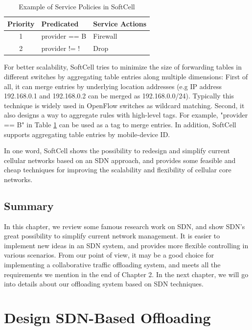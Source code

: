 \documentclass[english]{tktltiki}
\begin{document}
\begin{table}
  \centering
  \begin{tabular}{|c|l|l|}
    \hline
    Priority & Predicated & Service Actions \\
    \hline
    1 & provider == B & Firewall \\
    \hline
    2 & provider != ! & Drop \\
    \hline
  \end{tabular}
  \caption{Example of Service Policies in SoftCell}  
  \label{tab:softcell}
\end{table}

For better scalability, SoftCell tries to minimize the size of forwarding tables in different switches by aggregating table entries along multiple dimensions: First of all, it can merge entries by underlying location addresses (e.g IP address 192.168.0.1 and 192.168.0.2 can be merged as 192.168.0.0/24). Typically this technique is widely used in OpenFlow switches as wildcard matching. Second, it also designs a way to aggregate rules with high-level tags. For example, "provider == B" in Table \ref{tab:softcell} can be used as a tag to merge entries. In addition, SoftCell supports aggregating table entries by mobile-device ID. 

In one word, SoftCell shows the possibility to redesign and simplify current cellular networks based on an SDN approach, and provides some feasible and cheap techniques for improving the scalability and flexibility of cellular core networks.


\subsection{Summary}

In this chapter, we review some famous research work on SDN, and show SDN's great possibility to simplify current network management. It is easier to implement new ideas in an SDN system, and provides more flexible controlling in various scenarios. From our point of view, it may be a good choice for implementing a collaborative traffic offloading system, and meets all the requirements we mention in the end of Chapter 2. In the next chapter, we will go into details about our offloading system based on SDN techniques.


\newpage

\section{Design SDN-Based Offloading}
\end{document}
